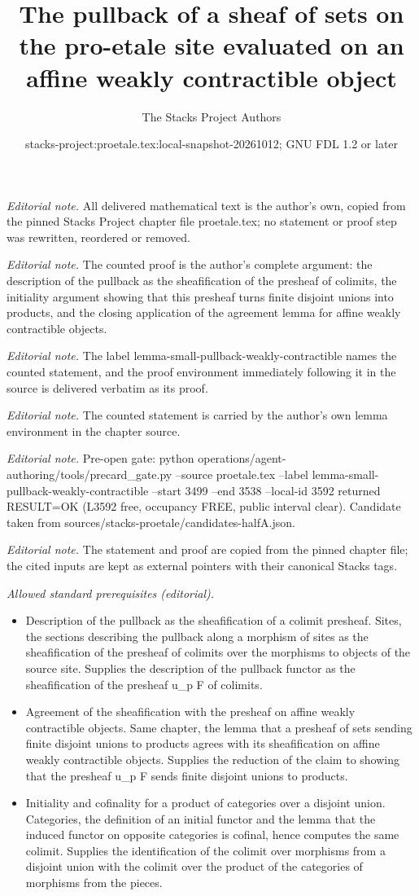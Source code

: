 \documentclass[10pt,a4paper]{amsart}
\title{The pullback of a sheaf of sets on the pro-etale site evaluated on an affine weakly contractible object}
\author{The Stacks Project Authors}
\date{stacks-project:proetale.tex:local-snapshot-20261012; GNU FDL 1.2 or later}
\theoremstyle{plain}
\theoremstyle{definition}
\theoremstyle{remark}
\numberwithin{equation}{subsection}
\begin{document}
\maketitle
\noindent\textit{Editorial note.} All delivered mathematical text is the author's own, copied from the pinned Stacks Project chapter file proetale.tex; no statement or proof step was rewritten, reordered or removed.\par\medskip
\noindent\textit{Editorial note.} The counted proof is the author's complete argument: the description of the pullback as the sheafification of the presheaf of colimits, the initiality argument showing that this presheaf turns finite disjoint unions into products, and the closing application of the agreement lemma for affine weakly contractible objects.\par\medskip
\noindent\textit{Editorial note.} The label lemma-small-pullback-weakly-contractible names the counted statement, and the proof environment immediately following it in the source is delivered verbatim as its proof.\par\medskip
\noindent\textit{Editorial note.} The counted statement is carried by the author's own lemma environment in the chapter source.\par\medskip
\noindent\textit{Editorial note.} Pre-open gate: python operations/agent-authoring/tools/precard\_gate.py --source proetale.tex --label lemma-small-pullback-weakly-contractible --start 3499 --end 3538 --local-id 3592 returned RESULT=OK (L3592 free, occupancy FREE, public interval clear). Candidate taken from sources/stacks-proetale/candidates-halfA.json.\par\medskip
\noindent\textit{Editorial note.} The statement and proof are copied from the pinned chapter file; the cited inputs are kept as external pointers with their canonical Stacks tags.\par\medskip
\noindent\textit{Allowed standard prerequisites (editorial).}\begin{itemize}
\item Description of the pullback as the sheafification of a colimit presheaf. Sites, the sections describing the pullback along a morphism of sites as the sheafification of the presheaf of colimits over the morphisms to objects of the source site. Supplies the description of the pullback functor as the sheafification of the presheaf u\_p F of colimits.
\item Agreement of the sheafification with the presheaf on affine weakly contractible objects. Same chapter, the lemma that a presheaf of sets sending finite disjoint unions to products agrees with its sheafification on affine weakly contractible objects. Supplies the reduction of the claim to showing that the presheaf u\_p F sends finite disjoint unions to products.
\item Initiality and cofinality for a product of categories over a disjoint union. Categories, the definition of an initial functor and the lemma that the induced functor on opposite categories is cofinal, hence computes the same colimit. Supplies the identification of the colimit over morphisms from a disjoint union with the colimit over the product of the categories of morphisms from the pieces.
\end{itemize}\medskip
\end{document}

